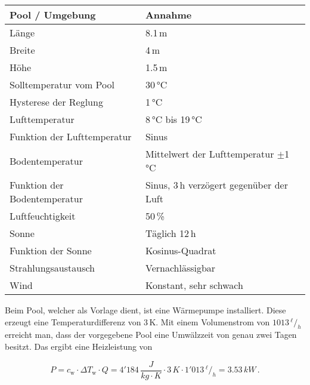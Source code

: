 \begin{table}[H]
	\centering
	\renewcommand{\arraystretch}{1.2}
	\begin{tabular}{l|l}
		\textbf{Pool / Umgebung}     & \textbf{Annahme}                         \\ \hline
		Länge                        & 8.1\,m                                   \\
		Breite                       & 4\,m                                     \\
		Höhe                         & 1.5\,m                                   \\
		Solltemperatur vom Pool      & 30\,°C                                   \\
		Hysterese der Reglung		 & 1\,°C                                    \\
		Lufttemperatur      		 & 8\,°C bis 19\,°C                         \\
		Funktion der Lufttemperatur  & Sinus                                    \\
		Bodentemperatur              & Mittelwert der Lufttemperatur $\pm$1\,°C \\
		Funktion der Bodentemperatur & Sinus, 3\,h verzögert gegenüber der Luft \\
		Luftfeuchtigkeit             & 50\,\%                                   \\
		Sonne                        & Täglich 12\,h                            \\
		Funktion der Sonne           & Kosinus-Quadrat                          \\
		Strahlungsaustausch			 & Vernachlässigbar						    \\
		Wind						 & Konstant, sehr schwach
	\end{tabular}
\end{table}

Beim Pool, welcher als Vorlage dient, ist eine Wärmepumpe installiert. Diese erzeugt eine Temperaturdifferenz von 3\,K. Mit einem Volumenstrom von $1013\,^{\si{\ell}}\!/_{\si{h}}$ erreicht man, dass der vorgegebene Pool eine Umwälzzeit von genau zwei Tagen besitzt. Das ergibt eine Heizleistung von

\begin{equation}
	P = c_\text{w} \cdot \Delta T_\text{w} \cdot Q = 4'184\,\frac{\si{J}}{\si{kg} \cdot \si{K}} \cdot 3\,\si{K} \cdot 1'013\,^{\si{\ell}}\!/_{\si{h}} = 3.53\,\si{kW}\,.
	\label{eq:Energie Wärmepumpe}
\end{equation}

